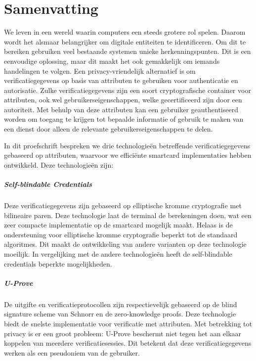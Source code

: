 \chapter*{Samenvatting}

We leven in een wereld waarin computers een steeds grotere rol spelen. Daarom 
wordt het alsmaar belangrijker om digitale entiteiten te identificeren. Om dit
te bereiken gebruiken veel bestaande systemen unieke herkenningspunten. Dit is
een eenvoudige oplossing, maar dit maakt het ook gemakkelijk om iemands 
handelingen te volgen. Een privacy-vriendelijk alternatief is om 
verificatiegegevens op basis van attributen te gebruiken voor authenticatie en
autorisatie. Zulke verificatiegegevens zijn een soort cryptografische container
voor attributen, ook wel gebruikerseigenschappen, welke gecertificeerd zijn 
door een autoriteit. Met behulp van deze attributen kan een gebruiker 
geauthentiseerd worden om toegang te krijgen tot bepaalde informatie of gebruik
te maken van een dienst door alleen de relevante gebruikerseigenschappen te 
delen.

In dit proefschrift bespreken we drie technologieën betreffende 
verificatiegegevens gebaseerd op attributen, waarvoor we efficiënte smartcard
implementaties hebben ontwikkeld. Deze technologieën zijn:

\paragraph{Self-blindable Credentials}
Deze verificatiegegevens zijn gebaseerd op elliptische kromme cryptografie met 
bilineaire paren. Deze technologie laat de terminal de berekeningen doen, wat 
een zeer compacte implementatie op de smartcard mogelijk maakt. Helaas is de 
ondersteuning voor elliptische kromme cryptografie beperkt tot de standaard 
algoritmes. Dit maakt de ontwikkeling van andere varianten op deze technologie
moeilijk. In vergelijking met de andere technologieën heeft de self-blindable 
credentials beperkte mogelijkheden.

\paragraph{U-Prove}
De uitgifte en verificatieprotocollen zijn respectievelijk gebaseerd op de 
blind signature scheme van Schnorr en de zero-knowledge proofs. Deze 
technologie biedt de snelste implementatie voor verificatie met attributen. 
Met betrekking tot privacy is er een groot probleem: U-Prove beschermt niet 
tegen het aan elkaar koppelen van meerdere verificatiesessies. Dit betekent
dat deze verificatiegegevens werken als een pseudoniem van de gebruiker.


